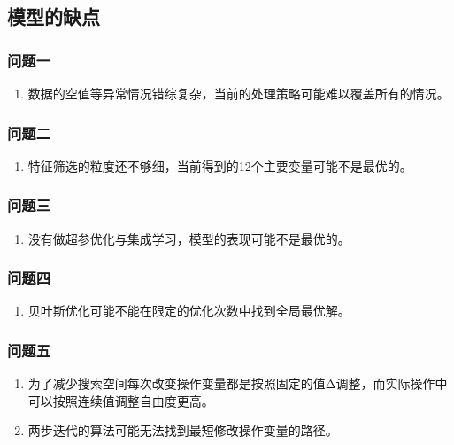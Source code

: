 \documentclass[bwprint]{gmcmthesis}
\begin{document}
\FloatBarrier
\subsection{模型的缺点}

\FloatBarrier
\subsubsection{问题一}
\begin{enumerate}[itemindent=20pt]
    \item 数据的空值等异常情况错综复杂，当前的处理策略可能难以覆盖所有的情况。
\end{enumerate}

\FloatBarrier
\subsubsection{问题二}
\begin{enumerate}[itemindent=20pt]
    \item 特征筛选的粒度还不够细，当前得到的12个主要变量可能不是最优的。
\end{enumerate}


\FloatBarrier
\subsubsection{问题三}
\begin{enumerate}[itemindent=20pt]
    \item 没有做超参优化与集成学习，模型的表现可能不是最优的。
\end{enumerate}


\FloatBarrier
\subsubsection{问题四}
\begin{enumerate}[itemindent=20pt]
    \item 贝叶斯优化可能不能在限定的优化次数中找到全局最优解。
\end{enumerate}

\FloatBarrier
\subsubsection{问题五}

\begin{enumerate}[itemindent=20pt]
    \item 为了减少搜索空间每次改变操作变量都是按照固定的值Δ调整，而实际操作中可以按照连续值调整自由度更高。
    \item 两步迭代的算法可能无法找到最短修改操作变量的路径。
\end{enumerate}
\end{document}
